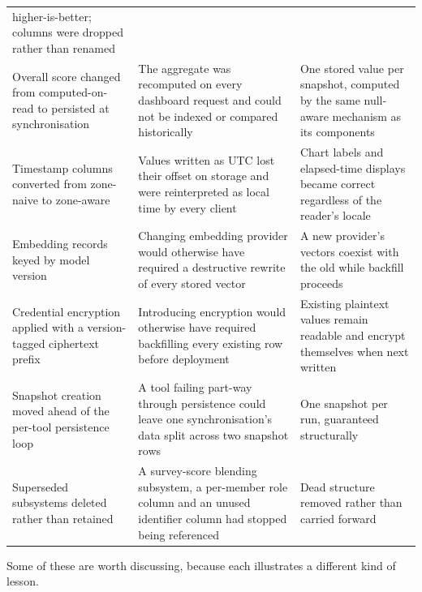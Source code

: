\begin{longtable}{
  >{\raggedright\arraybackslash}p{}
  >{\raggedright\arraybackslash}p{}
  >{\raggedright\arraybackslash}p{}
}
higher-is-better; columns were dropped rather than renamed \\
\addlinespace
Overall score changed from computed-on-read to persisted at synchronisation & The
aggregate was recomputed on every dashboard request and could not be indexed or
compared historically & One stored value per snapshot, computed by the same
null-aware mechanism as its components \\
\addlinespace
Timestamp columns converted from zone-naive to zone-aware & Values written as UTC
lost their offset on storage and were reinterpreted as local time by every client &
Chart labels and elapsed-time displays became correct regardless of the reader's
locale \\
\addlinespace
Embedding records keyed by model version & Changing embedding provider would
otherwise have required a destructive rewrite of every stored vector & A new
provider's vectors coexist with the old while backfill proceeds \\
\addlinespace
Credential encryption applied with a version-tagged ciphertext prefix & Introducing
encryption would otherwise have required backfilling every existing row before
deployment & Existing plaintext values remain readable and encrypt themselves when
next written \\
\addlinespace
Snapshot creation moved ahead of the per-tool persistence loop & A tool failing
part-way through persistence could leave one synchronisation's data split across two
snapshot rows & One snapshot per run, guaranteed structurally \\
\addlinespace
Superseded subsystems deleted rather than retained & A survey-score blending
subsystem, a per-member role column and an unused identifier column had stopped being
referenced & Dead structure removed rather than carried forward \\
\end{longtable}

Some of these are worth discussing, because each illustrates a different kind of
lesson.

